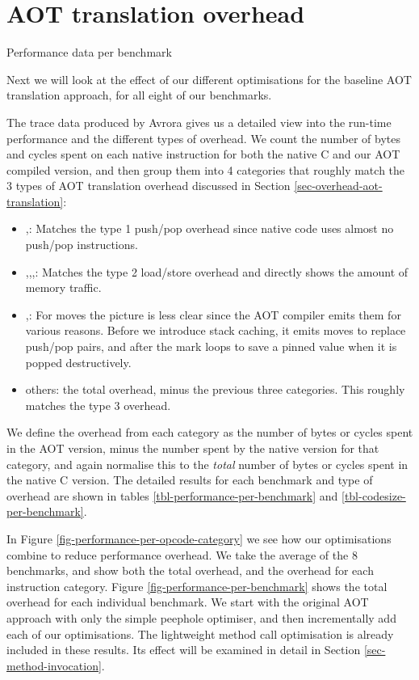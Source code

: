 \section{AOT translation overhead}
\begin{table}[]
 \centering
 \caption{Performance data per benchmark}
 \label{tbl-performance-per-benchmark}
 \small
 \scriptsize
 \setlength{\tabcolsep}{4pt}
 
 \setlength{\tabcolsep}{6pt}
\end{table}

Next we will look at the effect of our different optimisations for the baseline AOT translation approach, for all eight of our benchmarks.

The trace data produced by Avrora gives us a detailed view into the run-time performance and the different types of overhead. We count the number of bytes and cycles spent on each native instruction for both the native C and our AOT compiled version, and then group them into 4 categories that roughly match the 3 types of AOT translation overhead discussed in Section \ref{sec-overhead-aot-translation}:
\begin{itemize}
	\item {},: Matches the type 1 push/pop overhead since native code uses almost no push/pop instructions.
	\item {},,,: Matches the type 2 load/store overhead and directly shows the amount of memory traffic.
	\item {},: For moves the picture is less clear since the AOT compiler emits them for various reasons. Before we introduce stack caching, it emits moves to replace push/pop pairs, and after the mark loops to save a pinned value when it is popped destructively.
	\item others: the total overhead, minus the previous three categories. This roughly matches the type 3 overhead.
\end{itemize}

We define the overhead from each category as the number of bytes or cycles spent in the AOT version, minus the number spent by the native version for that category, and again normalise this to the \emph{total} number of bytes or cycles spent in the native C version. The detailed results for each benchmark and type of overhead are shown in tables \ref{tbl-performance-per-benchmark} and \ref{tbl-codesize-per-benchmark}.

In Figure \ref{fig-performance-per-opcode-category} we see how our optimisations combine to reduce performance overhead. We take the average of the 8 benchmarks, and show both the total overhead, and the overhead for each instruction category. Figure \ref{fig-performance-per-benchmark} shows the total overhead for each individual benchmark. We start with the original AOT approach with only the simple peephole optimiser, and then incrementally add each of our optimisations. The lightweight method call optimisation is already included in these results. Its effect will be examined in detail in Section \ref{sec-method-invocation}.

